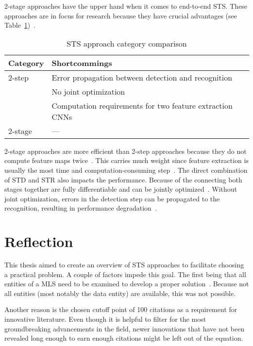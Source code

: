 2-stage approaches have the upper hand when it comes to end-to-end \ac{STS}.
These approaches are in focus for research because they have crucial
advantages (see Table~\ref{tb:E2E-comparison})~\citep{chen_text_2021}.
\begin{table}[h]
    \centering\scriptsize%
    \begin{tabular}{p{}p{}}
        \textbf{Category} & \textbf{Shortcommings} \\
        \toprule
        2-step & Error propagation between detection and
            recognition~\citep{chen_text_2021,long_scene_2021}\\
        & No joint optimization~\citep{qiao_text_2021, chen_text_2021}\\
        & Computation requirements for two feature extraction
            CNNs~\citep{liu_fots_2018,chen_text_2021} \\
        2-stage & --- \\
        \bottomrule
    \end{tabular}
    \caption{STS approach category comparison\label{tb:E2E-comparison}}
\end{table}
2-stage approaches are more efficient than 2-step approaches because they do not compute feature maps
twice~\citep{liu_fots_2018,chen_text_2021}.
This carries much weight since feature extraction is usually the most time and
computation-consuming step~\citep{liu_fots_2018}.
The direct combination of \ac{STD} and \ac{STR} also impacts the performance.
Because of the connecting both stages together are fully differentiable and can be jointly
optimized~\citep{chen_text_2021,long_scene_2021,qiao_text_2021}.
Without joint optimization, errors in the detection step can be propagated to the
recognition, resulting in performance degradation~\citep{chen_text_2021,qiao_text_2021}.

\section{Reflection}
This thesis aimed to create an overview of \ac{STS} approaches to facilitate
choosing a practical problem.
A couple of factors impede this goal.
The first being that all entities of a \ac{MLS} need to be examined to develop a proper
solution~\citep{siebert_construction_2021,nakamichi_requirements-driven_2020}.
Because not all entities (most notably the data entity) are available, this was not possible.

Another reason is the chosen cutoff point of 100 citations as a requirement for innovative literature.
Even though it is helpful to filter for the most groundbreaking advancements in the field,
newer innovations that have not been revealed long enough to earn enough citations might be left
out of the equation.


